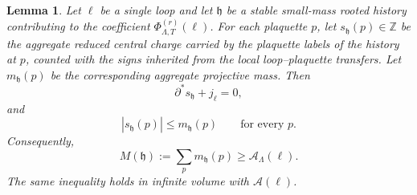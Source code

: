 \documentclass[11pt,a4paper,reqno]{amsart}
\newtheorem{lemma}[theorem]{Lemma}
\theoremstyle{definition}
\theoremstyle{remark}
\newcommand\Z{{\mathbb{Z}}}
\begin{document}
\begin{lemma}\label{lem:mass-fills-loop}
Let $\ell$ be a single loop and let $\mathfrak h$ be a stable small-mass rooted history contributing to the coefficient $\Phi^{(r)}_{\Lambda,T}(\ell)$. For each plaquette $p$, let $s_{\mathfrak h}(p)\in\Z$ be the aggregate reduced central charge carried by the plaquette labels of the history at $p$, counted with the signs inherited from the local loop--plaquette transfers. Let $m_{\mathfrak h}(p)$ be the corresponding aggregate projective mass. Then
\begin{equation}\label{eq:history-filling-current}
\partial^*s_{\mathfrak h}+j_\ell=0,
\end{equation}
and
\begin{equation}\label{eq:history-charge-mass}
|s_{\mathfrak h}(p)|\le m_{\mathfrak h}(p)\qquad\text{for every }p.
\end{equation}
Consequently,
\begin{equation}\label{eq:mass-fills-loop}
M(\mathfrak h):=\sum_p m_{\mathfrak h}(p)\ge \mathcal A_\Lambda(\ell).
\end{equation}
The same inequality holds in infinite volume with $\mathcal A(\ell)$.
\end{lemma}
\end{document}
